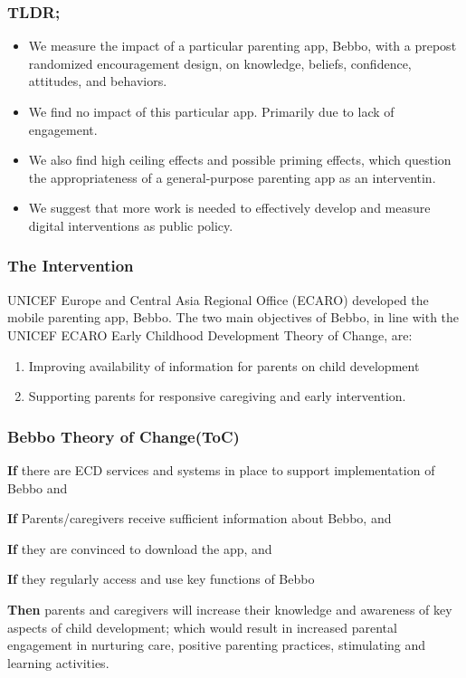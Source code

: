 \documentclass[aspectratio=169]{beamer}
\begin{document}
\begin{frame}
  \frametitle{TLDR;}

  \begin{itemize}
  \item We measure the impact of a particular parenting app, Bebbo, with a prepost randomized encouragement design, on knowledge, beliefs, confidence, attitudes, and behaviors.
  \item We find no impact of this particular app. Primarily due to lack of engagement.
  \item We also find high ceiling effects and possible priming effects, which question the appropriateness of a general-purpose parenting app as an interventin.
  \item We suggest that more work is needed to effectively develop and measure digital interventions as public policy.
  \end{itemize}
\end{frame}



\begin{frame}
  \frametitle{The Intervention}

  UNICEF Europe and Central Asia Regional Office (ECARO) developed the mobile parenting app, Bebbo. The two main objectives of Bebbo, in line with the UNICEF ECARO Early Childhood Development Theory of Change, are:

  \begin{enumerate}
  \item Improving availability of information for parents on child development
  \item Supporting parents for responsive caregiving and early intervention.
  \end{enumerate}

\end{frame}

\begin{frame}
\frametitle{Bebbo Theory of Change(ToC)}
\textbf{If} there are ECD services and systems in place to support implementation of Bebbo and

\textbf{If} Parents/caregivers receive sufficient information about Bebbo, and

\textbf{If} they are convinced to download the app, and

\textbf{If} they regularly access and use key functions of Bebbo

\textbf{Then} parents and caregivers will increase their knowledge and awareness of key aspects of child development; which would result in increased parental engagement in nurturing care, positive parenting practices, stimulating and learning activities.

\end{frame}
\end{document}
